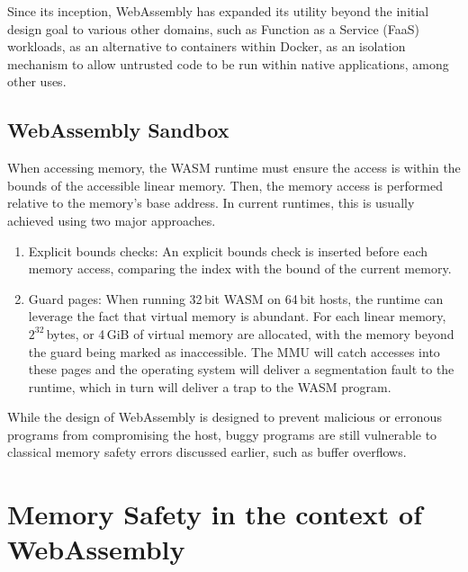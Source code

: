Since its inception, WebAssembly has expanded its utility beyond the initial design goal to various other domains, such as Function as a Service (FaaS) workloads, as an alternative to containers within Docker, as an isolation mechanism to allow untrusted code to be run within native applications, among other uses.

\subsection{WebAssembly Sandbox}
\label{subsec:webassembly-sandbox}
When accessing memory, the \ac{WASM} runtime must ensure the access is within the bounds of the accessible linear memory.
Then, the memory access is performed relative to the memory's base address.
In current runtimes, this is usually achieved using two major approaches.
\begin{enumerate}
    \item Explicit bounds checks: An explicit bounds check is inserted before each memory access, comparing the index with the bound of the current memory.
    \item Guard pages: When running 32\,bit \ac{WASM} on 64\,bit hosts, the runtime can leverage the fact that virtual memory is abundant.
    For each linear memory, $2^{32}$\,bytes, or 4\,GiB of virtual memory are allocated, with the memory beyond the guard being marked as inaccessible.
    The MMU will catch accesses into these pages and the operating system will deliver a segmentation fault to the runtime, which in turn will deliver a trap to the \ac{WASM} program.
\end{enumerate}


While the design of WebAssembly is designed to prevent malicious or erronous programs from compromising the host, buggy programs are still vulnerable to classical memory safety errors discussed earlier, such as buffer overflows.

\section{Memory Safety in the context of WebAssembly}
\label{sec:memory-safety}

